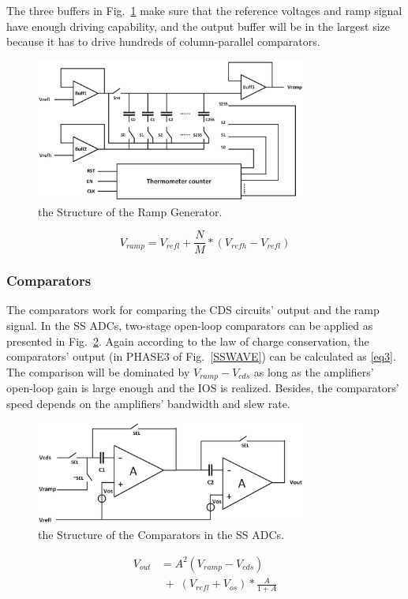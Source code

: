 \documentclass[conference]{IEEEtran}
\begin{document}
The three buffers in Fig.~\ref{RAMP} make sure that the reference voltages and ramp signal have enough driving capability, and the output buffer will be in the largest size because it has to drive hundreds of column-parallel comparators.
\begin{figure}[htbp]
	\centerline{\includegraphics[width=3.5in]{./Figures/RAMP.eps}}
	\caption{the Structure of the Ramp Generator.}
	\label{RAMP}
\end{figure} 
\begin{equation}
	V_{ramp}=V_{refl}+\frac{N}{M}\ast\left(V_{refh}-V_{refl}\right)
		\label{eq2}
\end{equation}
\subsubsection{Comparators}
The comparators work for comparing the CDS circuits' output and the ramp signal. In the SS ADCs, two-stage open-loop comparators can be applied as presented in Fig.~\ref{COM}. Again according to the law of charge conservation, the comparators’ output (in PHASE3 of Fig.~\ref{SSWAVE}) can be calculated as \eqref{eq3}. The comparison will be dominated by $V_{ramp}-V_{cds}$ as long as the amplifiers’ open-loop gain is large enough and the IOS is realized. Besides, the comparators’ speed depends on the amplifiers’ bandwidth and slew rate.
\begin{figure}[htbp]
	\centerline{\includegraphics[width=3.5in]{./Figures/COM.eps}}
	\caption{the Structure of the Comparators in the SS ADCs.}
	\label{COM}
\end{figure} 
\begin{equation}
	\begin{aligned}
		V_{out}&=A^2(V_{ramp}-V_{cds})\\
		&\;{+}\;\left(V_{refl}+V_{os}\right)\ast\frac{A}{1+A}\\ 		
		\label{eq3}
	\end{aligned}
\end{equation}
\end{document}
